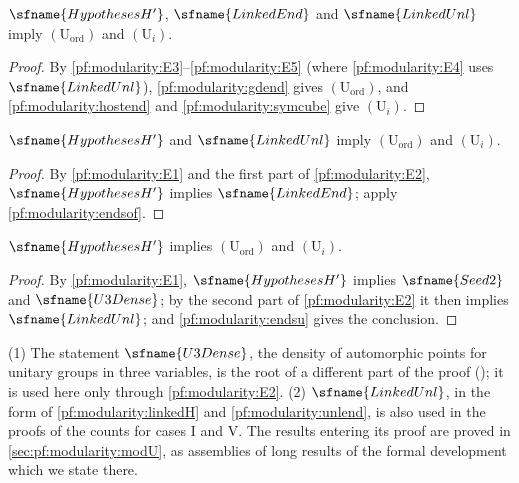 \begin{theorem}\label{pf:modularity:endsof}
$\sfname{HypothesesH'}$, $\sfname{LinkedEnd}$ and $\sfname{LinkedUnl}$ imply $(\mathrm{U}_{\mathrm{ord}})$ and $(\mathrm{U}_i)$.
\end{theorem}

\begin{proof}
By \ref{pf:modularity:E3}--\ref{pf:modularity:E5} (where \ref{pf:modularity:E4} uses $\sfname{LinkedUnl}$),
\cref{pf:modularity:gdend} gives $(\mathrm{U}_{\mathrm{ord}})$, and \cref{pf:modularity:hostend} and
\cref{pf:modularity:symcube} give $(\mathrm{U}_i)$.
\end{proof}

\begin{corollary}\label{pf:modularity:endsu}
$\sfname{HypothesesH'}$ and $\sfname{LinkedUnl}$ imply $(\mathrm{U}_{\mathrm{ord}})$ and $(\mathrm{U}_i)$.
\end{corollary}

\begin{proof}
By \ref{pf:modularity:E1} and the first part of \ref{pf:modularity:E2}, $\sfname{HypothesesH'}$ implies
$\sfname{LinkedEnd}$; apply \cref{pf:modularity:endsof}.
\end{proof}

\begin{theorem}\label{pf:modularity:ends0}
$\sfname{HypothesesH'}$ implies $(\mathrm{U}_{\mathrm{ord}})$ and $(\mathrm{U}_i)$.
\end{theorem}

\begin{proof}
By \ref{pf:modularity:E1}, $\sfname{HypothesesH'}$ implies $\sfname{Seed2}$ and $\sfname{U3Dense}$; by the second part of
\ref{pf:modularity:E2} it then implies $\sfname{LinkedUnl}$; and \cref{pf:modularity:endsu} gives the conclusion.
\end{proof}

\begin{remark}\label{pf:modularity:rem-ends}
(1) The statement $\sfname{U3Dense}$, the density of automorphic points for unitary groups in three variables, is the
root of a different part of the proof (); it
is used here only through \ref{pf:modularity:E2}.
(2) $\sfname{LinkedUnl}$, in the form of \cref{pf:modularity:linkedH} and \cref{pf:modularity:unlend}, is also used in the
proofs of the counts for cases I and V. The results entering its proof are proved in \cref{sec:pf:modularity:modU}, as
assemblies of long results of the formal development which we state there.
\end{remark}

